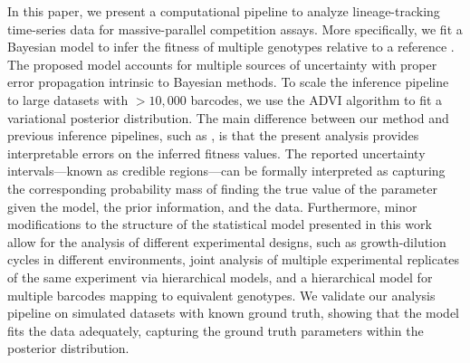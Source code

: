 \documentclass[
  letterpaper,
  DIV=11,
  numbers=noendperiod]{scrartcl}
\begin{document}
\begin{refsegment}
In this paper, we present a computational pipeline to analyze
lineage-tracking time-series data for massive-parallel competition
assays. More specifically, we fit a Bayesian model to infer the fitness
of multiple genotypes relative to a reference
\autocite{kinsler2020,ascensao2023}. The proposed model accounts for
multiple sources of uncertainty with proper error propagation intrinsic
to Bayesian methods. To scale the inference pipeline to large datasets
with \(> 10,000\) barcodes, we use the ADVI algorithm
\autocite{kucukelbir2016} to fit a variational posterior distribution.
The main difference between our method and previous inference pipelines,
such as \textcite{li2023}, is that the present analysis provides
interpretable errors on the inferred fitness values. The reported
uncertainty intervals---known as credible regions---can be formally
interpreted as capturing the corresponding probability mass of finding
the true value of the parameter given the model, the prior information,
and the data. Furthermore, minor modifications to the structure of the
statistical model presented in this work allow for the analysis of
different experimental designs, such as growth-dilution cycles in
different environments, joint analysis of multiple experimental
replicates of the same experiment via hierarchical models, and a
hierarchical model for multiple barcodes mapping to equivalent
genotypes. We validate our analysis pipeline on simulated datasets with
known ground truth, showing that the model fits the data adequately,
capturing the ground truth parameters within the posterior distribution.


\end{refsegment}
\end{document}
